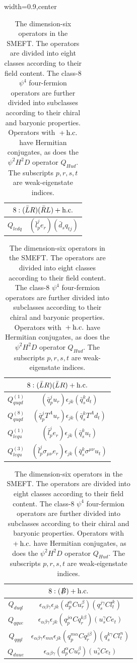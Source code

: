\begin{table}[H]
\begin{center}
\begin{adjustbox}{width=0.9\textwidth,center}
\begin{minipage}[t]{3.75cm}
\renewcommand{\arraystretch}{1.5}
\begin{tabular}[t]{c|c}
\multicolumn{2}{c}{\boldmath$8:(\bar LR)(\bar RL)+\mathrm{h.c.}$} \\
\hline
$Q_{ledq}$ & $(\bar l_p^j e_r)(\bar d_s q_{tj})$ 
\end{tabular}
\end{minipage}
\hspace{0.4cm}
%
%
\begin{minipage}[t]{5.5cm}
\renewcommand{\arraystretch}{1.5}
\begin{tabular}[t]{c|c}
\multicolumn{2}{c}{\boldmath$8:(\bar LR)(\bar L R)+\mathrm{h.c.}$} \\
\hline
$Q_{quqd}^{(1)}$ & $(\bar q_p^j u_r) \epsilon_{jk} (\bar q_s^k d_t)$ \\
%
$Q_{quqd}^{(8)}$ & $(\bar q_p^j T^A u_r) \epsilon_{jk} (\bar q_s^k T^A d_t)$ \\
%
$Q_{lequ}^{(1)}$ & $(\bar l_p^j e_r) \epsilon_{jk} (\bar q_s^k u_t)$ \\
%
$Q_{lequ}^{(3)}$ & $(\bar l_p^j \sigma_{\mu\nu} e_r) \epsilon_{jk} (\bar q_s^k \sigma^{\mu\nu} u_t)$
\end{tabular}
\end{minipage}
%
\begin{minipage}[t]{5.6cm}
\renewcommand{\arraystretch}{1.5}
\begin{tabular}[t]{c|c}
\multicolumn{2}{c}{\boldmath$8:(\slashed{B})+\mathrm{h.c.}$} \\
\hline
$Q_{duql}$ & $\epsilon_{\alpha\beta\gamma} \epsilon_{jk} (d_p^{\alpha} C u_r^{\beta}) (q_s^{j\gamma} C l_t^k)$ \\
%
$Q_{qque}$ & $\epsilon_{\alpha\beta\gamma} \epsilon_{jk} (q_p^{j\alpha} C q_r^{k\beta}) (u_s^{\gamma} C e_t)$ \\
%
$Q_{qqql}$ & $\epsilon_{\alpha\beta\gamma} \epsilon_{mn} \epsilon_{jk} (q_p^{m\alpha} C q_r^{j\beta}) (q_s^{k\gamma} C l_t^n)$ \\
%
$Q_{duue}$ & $\epsilon_{\alpha\beta\gamma} (d_p^{\alpha} C u_r^{\beta}) (u_s^{\gamma} C e_t)$
\end{tabular}
\end{minipage}
\end{adjustbox}
\end{center}
\caption{The dimension-six operators in the SMEFT. The operators are divided into eight classes according to their field content. The class-8 $\psi^4$ four-fermion operators are further divided into subclasses according to their chiral and baryonic properties. Operators with ${}+\mathrm{h.c.}$ have Hermitian conjugates, as does the $\psi^2 H^2 D$ operator $Q_{Hud}$. The subscripts $p, r, s, t$ are weak-eigenstate indices.}
\label{tab:smeft6ops}
\end{table}